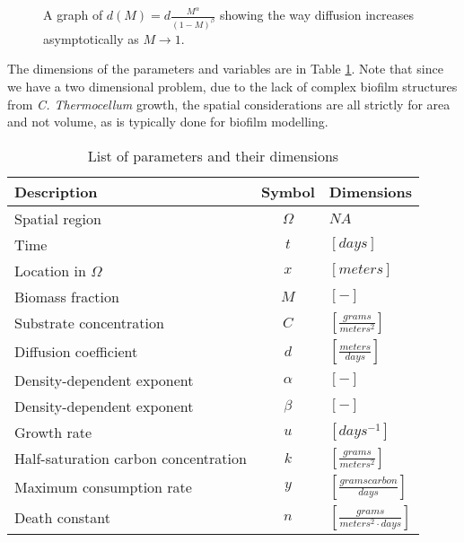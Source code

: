 \begin{figure}
  \centering
  \caption{A graph of $d(M) = d \frac{M^\alpha}{(1 - M)^\beta}$ showing the way diffusion increases asymptotically as $M \to 1$.}
  \label{fig:show_d}
\end{figure}
 
The dimensions of the parameters and variables are in Table \ref{tab:varDimensions}.
Note that since we have a two dimensional problem, due to the lack of complex biofilm structures from \textit{C. Thermocellum} growth, the spatial considerations are all strictly for area and not volume, as is typically done for biofilm modelling.
  \begin{table}[!hbt]
    \centering
    \begin{tabular}{|l |c |l |}
      \hline 
      Description & Symbol & Dimensions \\
      \hline
      \hline
      Spatial region & $\Omega$ &  $NA$ \\
      \hline 
      Time & $t$ & $\left[days\right]$ \\
      Location in $\Omega$ & $x$ & $\left[meters\right]$ \\
      \hline
      Biomass fraction & $M$ & $\left[-\right]$ \\
      Substrate concentration & $C$ & $\left[\frac{grams}{meters^2}\right]$ \\
      \hline
      Diffusion coefficient & $d$ & $\left[\frac{meters}{days}\right]$ \\
      Density-dependent exponent & $ \alpha $ & $\left[-\right]$  \\
      Density-dependent exponent & $ \beta  $ & $\left[-\right]$  \\
      Growth rate & $ u $ & $\left[days^{-1} \right]$ \\
      Half-saturation carbon concentration & $ k $ & $\left[\frac{grams}{meters^2}\right]$ \\
      Maximum consumption rate & $y$ & $\left[\frac{grams carbon}{days}\right]$  \\
      Death constant & $n$ & $\left[\frac{grams}{meters^2 \cdot days}\right]$ \\
      \hline
    \end{tabular}
    \caption{List of parameters and their dimensions}
        \label{tab:varDimensions}
  \end{table}

